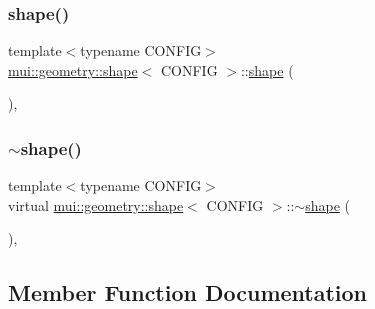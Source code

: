 \mbox{\label{classmui_1_1geometry_1_1shape_aa543de09ace275adebd093acdb69ad22}} 
\subsubsection{\texorpdfstring{shape()}{shape()}\hspace{0.1cm}{\footnotesize\ttfamily [3/3]}}
{\footnotesize\ttfamily template$<$typename C\+O\+N\+F\+IG$>$ \\
\hyperlink{classmui_1_1geometry_1_1shape}{mui\+::geometry\+::shape}$<$ C\+O\+N\+F\+IG $>$\+::\hyperlink{classmui_1_1geometry_1_1shape}{shape} (\begin{DoxyParamCaption}\item[{const \hyperlink{classmui_1_1geometry_1_1shape}{shape}$<$ C\+O\+N\+F\+IG $>$ \&}]{ }\end{DoxyParamCaption})\hspace{0.3cm}{\ttfamily [protected]}, {\ttfamily [default]}}

\mbox{\label{classmui_1_1geometry_1_1shape_a693b2265e6ffc817abb1a441b486f6b3}} 
\subsubsection{\texorpdfstring{$\sim$shape()}{~shape()}}
{\footnotesize\ttfamily template$<$typename C\+O\+N\+F\+IG$>$ \\
virtual \hyperlink{classmui_1_1geometry_1_1shape}{mui\+::geometry\+::shape}$<$ C\+O\+N\+F\+IG $>$\+::$\sim$\hyperlink{classmui_1_1geometry_1_1shape}{shape} (\begin{DoxyParamCaption}{ }\end{DoxyParamCaption})\hspace{0.3cm}{\ttfamily [inline]}, {\ttfamily [virtual]}}



\subsection{Member Function Documentation}
\mbox{\label{classmui_1_1geometry_1_1shape_adf598ec651ea425553bd8e617cac7430}} 
